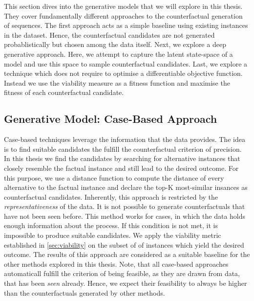 \documentclass[./../../paper.tex]{subfiles}
\begin{document}
This section dives into the generative models that we will explore in this thesis. They cover fundamentally different approaches to the counterfactual generation of sequences. The first approach acts as a simple baseline using existing instances in the dataset. Hence, the counterfactual candidates are not generated probablistically but chosen among the data itself. Next, we explore a deep generative approach. Here, we attempt to capture the latent state-space of a model and use this space to sample counterfactual candidates.  Last, we explore a technique which does not require to optimise a differentiable objective function. Instead we use the viability measure as a fitness function and maximise the fitness of each counterfactual candidate.

\subsection{Generative Model: Case-Based Approach}
Case-based techniques leverage the information that the data provides. The idea is to find suitable candidates the fulfill the counterfactual criterion of precision. In this thesis we find the candidates by searching for alternative \glspl{instance} that closely resemble the factual instance and still lead to the desired outcome. For this purpose, we use a distance function to compute the distance of every alternative to the factual instance and declare the top-K most-similar insances as counterfactual candidates. Inherently, this approach is restricted by the \emph{representativeness} of the data. It is not possible to generate counterfactuals that have not been seen before. This method works for cases, in which the data holds enough information about the process. If this condition is not met, it is impossible to produce suitable candidates. 
We apply the viability metric established in \autoref{sec:viability} on the subset of of instances which yield the desired outcome. 
The results of this approach are considered as a suitable baseline for the other methods explored in this thesis. Note, that all case-based approaches automaticall fulfill the criterion of being feasible, as they are drawn from data, that has been \emph{seen} already. Hence, we expect their feasibility to always be higher than the counterfactuals generated by other methods. 
\end{document}
